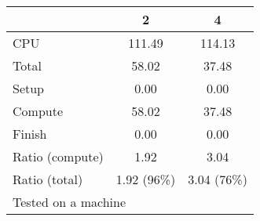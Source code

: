\begin{tabular}{l*{2}{c}}\toprule
& 2 &               4 \\ \midrule
CPU &   111.49 &    114.13 \\
Total &    58.02 &     37.48 \\
\hspace{2mm} Setup &     0.00 &      0.00 \\
\hspace{2mm} Compute &    58.02 &     37.48 \\
\hspace{2mm} Finish &     0.00 &      0.00 \\
\midrule Ratio (compute) &     1.92 &      3.04 \\
Ratio (total) &     1.92 (96\%)&      3.04 (76\%)\\
\bottomrule
\multicolumn{3}{l}{\footnotesize Tested on a \windows1 machine}
\end{tabular}

\endinput